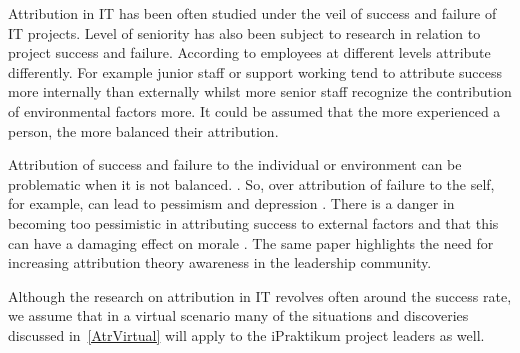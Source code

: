Attribution in IT has been often studied under the veil of success and failure of IT projects.  Level of seniority has also been subject to research in relation to project success and failure.  According to \cite{Standing2016} employees at different levels attribute differently.  For example junior staff or support working tend to attribute success more internally than externally whilst more senior staff recognize the contribution of environmental factors more.  It could be assumed that the more experienced a person, the more balanced their attribution. 



Attribution of success and failure to the individual or environment can be problematic when it is not balanced. \cite{Standing2012}.  So, over attribution of failure to the self, for example, can lead to pessimism and depression \cite{Standing2012}.  There is a danger in becoming too pessimistic in attributing success to external factors and that this can have a damaging effect on morale \cite{Standing2016}.  The same paper highlights the need for increasing attribution theory awareness in the leadership community.

Although the research on attribution in IT revolves often around the success rate, we assume that in a virtual scenario many of the situations and discoveries discussed in~\autoref{AtrVirtual} will apply to the iPraktikum project leaders as well.


